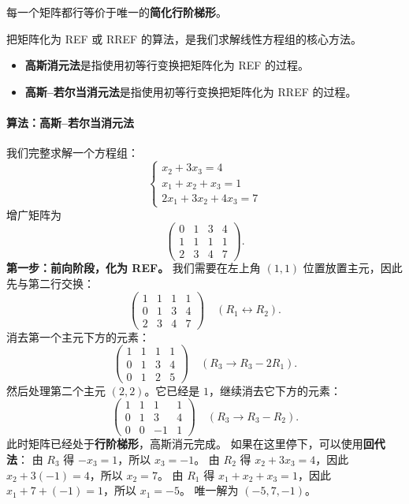 \begin{theorem}
每一个矩阵都行等价于唯一的\textbf{简化行阶梯形}。
\end{theorem}

把矩阵化为 REF 或 RREF 的算法，是我们求解线性方程组的核心方法。

\begin{definition}
\begin{itemize}
    \item \textbf{高斯消元法}是指使用初等行变换把矩阵化为 REF 的过程。
    \item \textbf{高斯--若尔当消元法}是指使用初等行变换把矩阵化为 RREF 的过程。
\end{itemize}
\end{definition}

\paragraph{算法：高斯--若尔当消元法}
我们完整求解一个方程组：
\[
\begin{cases}
x_2+3x_3=4\\
x_1+x_2+x_3=1\\
2x_1+3x_2+4x_3=7
\end{cases}
\]
增广矩阵为
\[
\left(\begin{array}{ccc|c}
0 & 1 & 3 & 4 \\
1 & 1 & 1 & 1 \\
2 & 3 & 4 & 7
\end{array}\right).
\]
\textbf{第一步：前向阶段，化为 REF。}
我们需要在左上角 $(1,1)$ 位置放置主元，因此先与第二行交换：
\[
\left(\begin{array}{ccc|c}
1 & 1 & 1 & 1 \\
0 & 1 & 3 & 4 \\
2 & 3 & 4 & 7
\end{array}\right) \quad (R_1\leftrightarrow R_2).
\]
消去第一个主元下方的元素：
\[
\left(\begin{array}{ccc|c}
1 & 1 & 1 & 1 \\
0 & 1 & 3 & 4 \\
0 & 1 & 2 & 5
\end{array}\right) \quad (R_3\to R_3-2R_1).
\]
然后处理第二个主元 $(2,2)$。它已经是 $1$，继续消去它下方的元素：
\[
\left(\begin{array}{ccc|c}
1 & 1 & 1 & 1 \\
0 & 1 & 3 & 4 \\
0 & 0 & -1 & 1
\end{array}\right) \quad (R_3\to R_3-R_2).
\]
此时矩阵已经处于\textbf{行阶梯形}，高斯消元完成。
如果在这里停下，可以使用\textbf{回代法}：
由 $R_3$ 得 $-x_3=1$，所以 $x_3=-1$。
由 $R_2$ 得 $x_2+3x_3=4$，因此 $x_2+3(-1)=4$，所以 $x_2=7$。
由 $R_1$ 得 $x_1+x_2+x_3=1$，因此 $x_1+7+(-1)=1$，所以 $x_1=-5$。
唯一解为 $(-5,7,-1)$。

